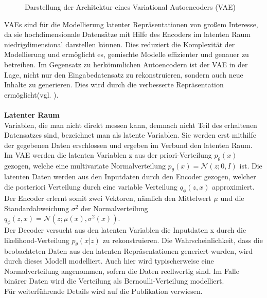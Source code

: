 \documentclass[%
thesis=student,%
coverpage=false,%
titlepage=false,%
headmarks=true, %
german,%
font=libertine, %
math=newpxtx, %
BCOR=5mm,%
coverBCOR=11mm%
]{tumbook}
\theoremstyle{break}
\begin{document}
\begin{figure}
	\caption{Darstellung der Architektur eines Variational Autoencoders (VAE)}
	\label{fig:vae}
\end{figure}
VAEs sind für die Modellierung latenter Repräsentationen von großem Interesse, da sie hochdimensionale Datensätze mit Hilfe des Encoders im latenten Raum niedrigdimensional darstellen können. Dies reduziert die Komplexität der Modellierung und ermöglicht es, gemischte Modelle effizienter und genauer zu betreiben. Im Gegensatz zu herkömmlichen Autoencodern ist der VAE in der Lage, nicht nur den Eingabedatensatz zu rekonstruieren, sondern auch neue Inhalte zu generieren. Dies wird durch die verbesserte Repräsentation ermöglicht(vgl. \cite{bigdata-insider-vae}).\\
\\
\textbf{Latenter Raum}\\
Variablen, die man nicht direkt messen kann, demnach nicht Teil des erhaltenen Datensatzes sind, bezeichnet man als latente Variablen. Sie werden erst mithilfe der gegebenen Daten erschlossen und ergeben im Verbund den latenten Raum.\\
Im VAE werden die latenten Variablen z aus der priori-Verteilung $p_\theta(x)$ gezogen, welche eine multivariate Normalverteilung $p_\theta(x) = \mathcal{N}(z;0,I) $ ist. Die latenten Daten werden aus den Inputdaten durch den Encoder  gezogen, welcher die posteriori Verteilung durch eine variable Verteilung $q_\phi(z,x)$ approximiert. Der Encoder erlernt somit zwei Vektoren, nämlich den Mittelwert \( \mu \) und die Standardabweichung \( \sigma^2 \) der Normalverteilung $q_\phi(z,x) = \mathcal{N}(z;\mu(x),\sigma^2(x))$.\\
Der Decoder versucht aus den latenten Variablen die Inputdaten x durch die likelihood-Verteilung $p_\theta(x|z)$  zu rekonstruieren. Die  Wahrscheinlichkeit, dass die beobachteten Daten aus den latenten Repräsentationen generiert wurden, wird durch dieses Modell modelliert. Auch hier wird typischerweise eine Normalverteilung angenommen, sofern die  Daten reellwertig sind. Im Falle binärer Daten wird die Verteilung als Bernoulli-Verteilung modelliert. \\ Für weiterführende Details wird auf die Publikation \cite{Auto-EncodingVariationalBayes} verwiesen.\\
\end{document}
